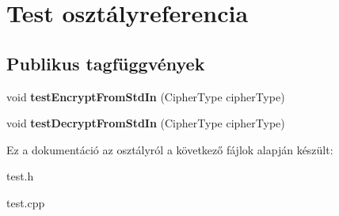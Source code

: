 \hypertarget{class_test}{}\section{Test osztályreferencia}
\label{class_test}
\subsection*{Publikus tagfüggvények}
\begin{DoxyCompactItemize}
\item 
\mbox{\label{class_test_a870d83f3bd5858285e0c760cb5e025c7}} 
void {\bfseries test\+Encrypt\+From\+Std\+In} (Cipher\+Type cipher\+Type)
\item 
\mbox{\label{class_test_a050c873569ee3ff1dcd5bebadfd310b2}} 
void {\bfseries test\+Decrypt\+From\+Std\+In} (Cipher\+Type cipher\+Type)
\end{DoxyCompactItemize}


Ez a dokumentáció az osztályról a következő fájlok alapján készült\+:\begin{DoxyCompactItemize}
\item 
test.\+h\item 
test.\+cpp\end{DoxyCompactItemize}
